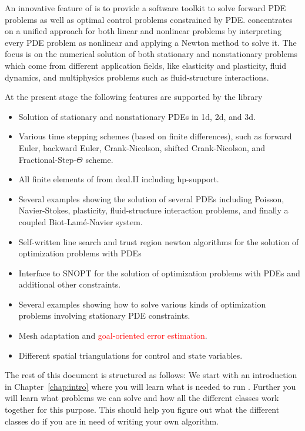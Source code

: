 An innovative feature of \dope{} is to provide a software toolkit to solve forward PDE
problems as well as optimal control problems constrained by PDE. 
\dope{} concentrates on a unified approach for both linear and nonlinear
problems by interpreting every PDE problem as nonlinear and applying a
Newton method to solve it. 
The focus is on the numerical solution of both stationary and nonstationary
problems which come from different application fields, like elasticity and
plasticity, fluid dynamics, and multiphysics problems such as 
fluid-structure interactions.


At the present stage the following features are supported by the library
\begin{itemize}
\item Solution of stationary and nonstationary PDEs in 1d, 2d, and 3d.
\item Various time stepping schemes (based on finite differences), 
  such as forward Euler, backward Euler,
  Crank-Nicolson, shifted Crank-Nicolson, and Fractional-Step-$\Theta$ scheme.
\item All finite elements of from deal.II including hp-support.
\item Several examples showing the solution of several PDEs including
   Poisson, Navier-Stokes, plasticity, fluid-structure interaction problems,
and finally a coupled Biot-Lam\'e-Navier system.
\item Self-written line search and trust region newton algorithms for the 
   solution of optimization problems with PDEs \cite{NoWr00}
\item Interface to SNOPT for the solution of optimization problems with PDEs and
  additional other constraints.
\item Several examples showing how to solve various kinds of optimization problems
  involving stationary PDE constraints.
\item Mesh adaptation and \textcolor{red}{goal-oriented error estimation}.
\item Different spatial triangulations for control and state variables.
\end{itemize}


The rest of this document is structured as follows: We start with an introduction in
Chapter~\ref{chap:intro} where you will learn what is needed to run \dope{}. 
Further you will learn what problems we can solve and how all the different classes 
work together for this purpose. This should help you figure out what the different classes
do if you are in need of writing your own algorithm.


